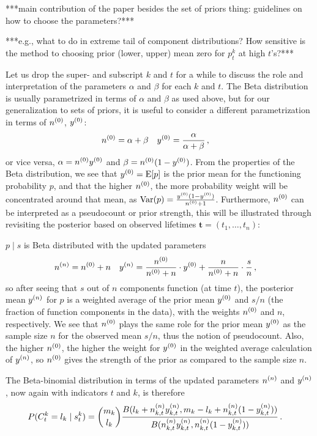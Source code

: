 \documentclass[authoryear, 12pt, a4paper]{elsarticle}
\renewcommand{\vec}[1]{{\bm#1}}
\newcommand{\E}{\operatorname{E}}
\newcommand{\V}{\operatorname{Var}}
\begin{document}
***main contribution of the paper besides the set of priors thing:
guidelines on how to choose the parameters?***

***e.g., what to do in extreme tail of component distributions?
How sensitive is the method to choosing prior (lower, upper) mean zero for $p^k_t$ at high $t$'s?***


Let us drop the super- and subscript $k$ and $t$ for a while
to discuss the role and interpretation of the parameters $\alpha$ and $\beta$
for each $k$ and $t$.
The Beta distribution is usually parametrized in terms of $\alpha$ and $\beta$ as used above, 
but for our generalization to sets of priors,
it is useful to consider a different parametrization in terms of $n^{(0)}$, $y^{(0)}$:
\begin{align*}
n^{(0)} &= \alpha + \beta &
y^{(0)} &= \frac{\alpha}{\alpha + \beta} \,,
\end{align*}
or vice versa, $\alpha = n^{(0)}y^{(0)}$ and $\beta = n^{(0)}(1-y^{(0)})$.
From the properties of the Beta distribution,
we see that $\yz = \E[p]$ is the prior mean for the functioning probability $p$,
and that the higher $n^{(0)}$, the more probability weight will be concentrated around that mean,
as $\V(p) = \frac{\yz (1-\yz)}{\nz + 1}$.
Furthermore, $n^{(0)}$ can be interpreted as a pseudocount or prior strength,
this will be illustrated through revisiting the posterior
based on observed lifetimes $\vec{t} = (t_1, \ldots, t_{n})$:

$p \mid s$ is Beta distributed with the updated parameters
\begin{align*}
n^{(n)} &= n^{(0)} + n &
y^{(n)} &= \frac{n^{(0)}}{n^{(0)} + n} \cdot y^{(0)} + \frac{n}{n^{(0)} + n} \cdot \frac{s}{n}\,,
\end{align*}
so after seeing that $s$ out of $n$ components function (at time $t$),
the posterior mean $y^{(n)}$ for $p$ is a weighted average of
the prior mean $y^{(0)}$ and $s/n$ (the fraction of function components in the data),
with the weights $n^{(0)}$ and $n$, respectively.
We see that $n^{(0)}$ plays the same role for the prior mean $y^{(0)}$
as the sample size $n$ for the observed mean $s/n$,
thus the notion of pseudocount.
Also, the higher $n^{(0)}$, the higher the weight for $y^{(0)}$
in the weighted average calculation of $y^{(n)}$,
so $n^{(0)}$ gives the strength of the prior as compared to the sample size $n$.

The Beta-binomial distribution in terms of the updated parameters $n^{(n)}$ and $y^{(n)}$,
now again with indicators $t$ and $k$,
is therefore
\begin{align*}
P(C^k_t = l_k \mid s^k_t) &= {m_k \choose l_k} \frac{B(l_k + n^{(n)}_{k,t}y^{(n)}_{k,t}, m_k - l_k + n^{(n)}_{k,t}(1-y^{(n)}_{k,t}))}
                                                    {B(n^{(n)}_{k,t}y^{(n)}_{k,t}, n^{(n)}_{k,t}(1-y^{(n)}_{k,t}))} \,.
\end{align*}
\end{document}
